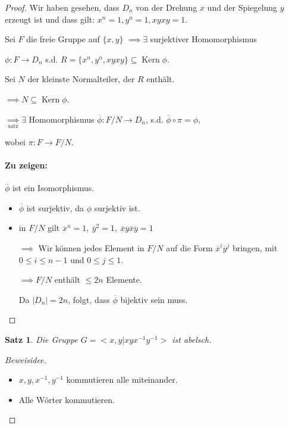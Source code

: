 \documentclass{article}
\theoremstyle{plain}
\newtheorem{theorem}{Satz}
\renewcommand{\ker}{\mathop{\mathrm{Kern}}}
\newcommand{\zykl}[1]{{<}{#1}{>}}
\begin{document}
\begin{proof}
    Wir haben gesehen, dass $D_n$ von der Drehung $x$ und der Spiegelung $y$ erzeugt ist und dass gilt: $x^n=1, y^n=1, xyxy=1$.

    Sei $F$ die freie Gruppe auf $\{x, y\}$
    $\implies \exists$ surjektiver Homomorphismus 
    
    $\phi\colon F\to D_n$ s.d.
    $R=\{x^n,y^n,xyxy\}\subseteq \ker\phi$.

    Sei $N$ der kleinste Normalteiler, der $R$ enthält. 
    
    $\implies N\subseteq \ker\phi$.

    $\underset{\text{satz}}{\implies} \exists$ Homomorphismus $\overline{\phi}\colon F/N\to D_n$, s.d. $\overline{\phi}\circ\pi=\phi$, 
    
    wobei $\pi\colon F\to F/N$.

    \paragraph{Zu zeigen:} $\overline{\phi}$ ist ein Isomorphismus.
    \begin{itemize}
        \item $\overline{\phi}$ ist surjektiv, da $\phi$ surjektiv ist.
        \item in $F/N$ gilt $\overline{x}^n=1,\ \overline{y}^2=1,\ \overline{x}\overline{y}\overline{x}\overline{y}=1$

        $\implies$ Wir können jedes Element in $F/N$ auf die Form $\overline{x}^i\overline{y}^j$ bringen, mit $0\leq i \leq n-1$ und $0\leq j\leq 1$.

        $\implies F/N$ enthält $\leq2n$ Elemente.
        
        Da $|D_n| = 2n$, folgt, dass $\overline{\phi}$ bijektiv sein muss.
     \end{itemize}
\end{proof}

\begin{theorem}
    Die Gruppe $G=\zykl{x, y|xyx^{-1}y^{-1}}$ ist abelsch.
\end{theorem}
\begin{proof}[Beweisidee]
    \quad
    \begin{itemize}
        \item $x, y, x^{-1}, y^{-1}$ kommutieren alle miteinander.
        \item Alle Wörter kommutieren.
    \end{itemize}
\end{proof}
\end{document}
